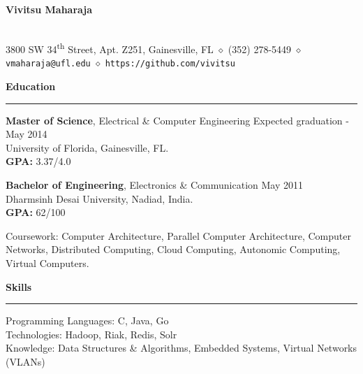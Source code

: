 \documentclass[10pt]{article}
\begin{document}
\begin{center}
\textbf{\Large Vivitsu Maharaja}
\date{}
\thispagestyle{empty}
\smallskip \\
3800 SW 34\textsuperscript{th} Street, Apt. Z251, Gainesville, FL $\diamond$ (352) 278-5449 $\diamond$ \texttt{vmaharaja@ufl.edu} $\diamond$ \texttt{https://github.com/vivitsu}
\end{center}


\textbf{Education}
\smallskip
\hrule
{\bf Master of Science}, Electrical \& Computer Engineering \hfill Expected graduation - May 2014\\
University of Florida, Gainesville, FL.\\
{\bf GPA:} 3.37/4.0

{\bf Bachelor of Engineering}, Electronics \& Communication \hfill May 2011\\
Dharmsinh Desai University, Nadiad, India.\\
{\bf GPA:} 62/100

Coursework: Computer Architecture, Parallel Computer Architecture, Computer Networks, Distributed Computing, Cloud Computing, Autonomic Computing, Virtual Computers.

\textbf{Skills}
\smallskip
\hrule
Programming Languages: C, Java, Go\\
Technologies: Hadoop, Riak, Redis, Solr\\
Knowledge: Data Structures \& Algorithms, Embedded Systems, Virtual Networks (VLANs) 
\end{document}

